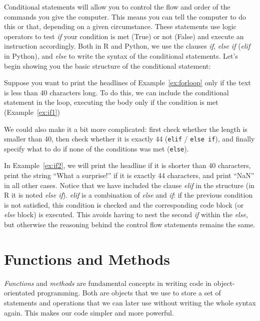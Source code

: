 Conditional statements will allow you to control the flow and order of
the commands you give the computer. This means you can tell the
computer to do this or that, depending on a given circumstance. These
statements use logic operators to test \emph{if} your condition is met
(True) or not (False) and execute an instruction accordingly. Both in
R and Python, we use the clauses \emph{if}, \emph{else if}
(\emph{elif} in Python), and \emph{else} to write the syntax of the
conditional statements. Let's begin showing you the basic structure of
the conditional statement:


Suppose you want to print the headlines of Example~\ref{ex:forloop} only if the text is less than 40 characters long.
To do this, we can include the conditional statement in the loop, executing the body only if the condition is met (Example~\ref{ex:if1})


We could also make it a bit more complicated: first check whether the length is smaller than 40,
then check whether it is exactly 44 (\verb|elif| / \verb|else if|), and finally specify what to do if none of the conditions was met (\verb|else|).

In Example~\ref{ex:if2}, we will print the headline if it is shorter than 40 characters,
print the string ``What a surprise!'' if it is exactly 44 characters, and print ``NaN'' in all other cases.
Notice that we have included the clause \emph{elif} in the structure (in R it is noted \emph{else if}).
\emph{elif} is a combination of \emph{else} and \emph{if}: if the previous condition is not satisfied,
this condition is checked and the corresponding code block (or \emph{else} block) is executed.
This avoids having to nest the second \emph{if} within the \emph{else}, but otherwise the reasoning behind the control flow statements remains the same.



\section{Functions and Methods}
\label{sec:functions}

\emph{Functions} and \emph{methods} are fundamental concepts in
writing code in object-orientated programming. Both are objects that
we use to store a set of statements and operations that we can later
use without writing the whole syntax again. This makes our code
simpler and more powerful.

